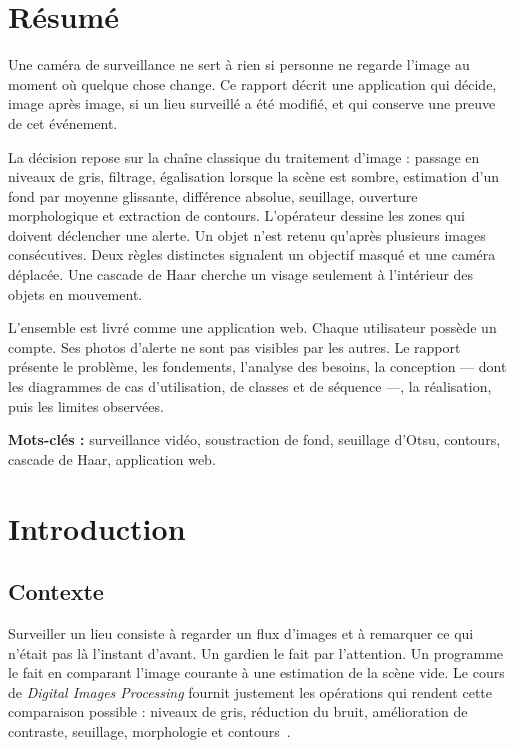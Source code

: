 \chapter*{Résumé}

Une caméra de surveillance ne sert à rien si personne ne regarde l'image au moment où quelque chose change. Ce rapport décrit une application qui décide, image après image, si un lieu surveillé a été modifié, et qui conserve une preuve de cet événement.

La décision repose sur la chaîne classique du traitement d'image : passage en niveaux de gris, filtrage, égalisation lorsque la scène est sombre, estimation d'un fond par moyenne glissante, différence absolue, seuillage, ouverture morphologique et extraction de contours. L'opérateur dessine les zones qui doivent déclencher une alerte. Un objet n'est retenu qu'après plusieurs images consécutives. Deux règles distinctes signalent un objectif masqué et une caméra déplacée. Une cascade de Haar cherche un visage seulement à l'intérieur des objets en mouvement.

L'ensemble est livré comme une application web. Chaque utilisateur possède un compte. Ses photos d'alerte ne sont pas visibles par les autres. Le rapport présente le problème, les fondements, l'analyse des besoins, la conception --- dont les diagrammes de cas d'utilisation, de classes et de séquence ---, la réalisation, puis les limites observées.

\vspace{0.8em}
\noindent\textbf{Mots-clés :} surveillance vidéo, soustraction de fond, seuillage d'Otsu, contours, cascade de Haar, application web.

\tableofcontents
\listoffigures
\clearpage

\chapter{Introduction}

\section{Contexte}

Surveiller un lieu consiste à regarder un flux d'images et à remarquer ce qui n'était pas là l'instant d'avant. Un gardien le fait par l'attention. Un programme le fait en comparant l'image courante à une estimation de la scène vide. Le cours de \emph{Digital Images Processing} fournit justement les opérations qui rendent cette comparaison possible : niveaux de gris, réduction du bruit, amélioration de contraste, seuillage, morphologie et contours~\cite{gonzalez}.

